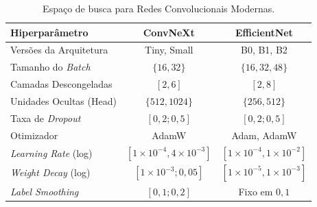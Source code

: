 \begin{table}[ht!]
    \centering
    \caption{Espaço de busca para Redes Convolucionais Modernas.}
    \label{tab:space_modern_cnn}
    \begin{tabular}{l c c}
        \toprule
        \textbf{Hiperparâmetro} & \textbf{ConvNeXt} & \textbf{EfficientNet} \\
        \midrule
        Versões da Arquitetura & Tiny, Small & B0, B1, B2 \\
        Tamanho do \textit{Batch} & $\{16, 32\}$ & $\{16, 32, 48\}$ \\
        Camadas Descongeladas & $[2, 6]$ & $[2, 8]$ \\
        Unidades Ocultas (Head) & $\{512, 1024\}$ & $\{256, 512\}$ \\
        Taxa de \textit{Dropout} & $[0,2; 0,5]$ & $[0,2; 0,5]$ \\
        Otimizador & AdamW & Adam, AdamW \\
        \textit{Learning Rate} (log) & $[1 \times 10^{-4}, 4 \times 10^{-3}]$ & $[1 \times 10^{-4}, 1 \times 10^{-2}]$ \\
        \textit{Weight Decay} (log) & $[1 \times 10^{-3}; 0,05]$ & $[1 \times 10^{-5}, 1 \times 10^{-3}]$ \\
        \textit{Label Smoothing} & $[0,1; 0,2]$ & Fixo em $0,1$ \\
        \bottomrule
    \end{tabular}
\end{table}

